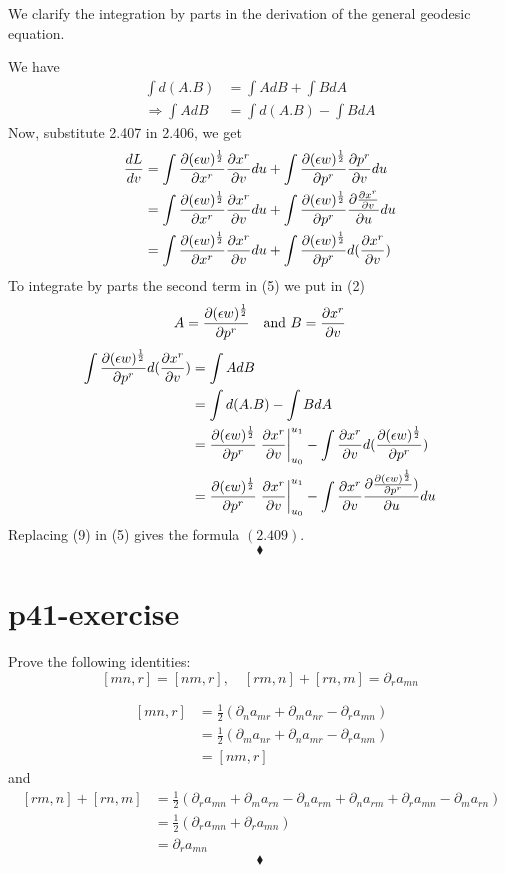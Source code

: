 \begin{tcolorbox}
We clarify the integration by parts in the derivation of the general  geodesic equation.
\end{tcolorbox}
We have 
\begin{align}
\int d(A.B) &= \int AdB + \int BdA\\
\Rightarrow  \int AdB &=  \int d(A.B)-\int BdA
\end{align}
Now, substitute 2.407 in 2.406, we get
\begin{align}
\dv{L}{v} &= \int \pdv{(\epsilon w)^{\frac{1}{2}}}{x^r} \pdv{x^r}{v} du +  \int \pdv{(\epsilon w)^{\frac{1}{2}}}{p^r} \pdv{p^r}{v} du\\
\ &= \int \pdv{(\epsilon w)^{\frac{1}{2}}}{x^r} \pdv{x^r}{v} du +  \int \pdv{(\epsilon w)^{\frac{1}{2}}}{p^r} \pdv{\pdv{x^r}{v}}{u} du\\
&= \int \pdv{(\epsilon w)^{\frac{1}{2}}}{x^r} \pdv{x^r}{v} du +  \int \pdv{(\epsilon w)^{\frac{1}{2}}}{p^r} d(\pdv{x^r}{v})
\end{align}
To integrate by parts the second term in (5) we put in (2)
$$A= \pdv{(\epsilon w)^{\frac{1}{2}}}{p^r} \quad \text{and } B = \pdv{x^r}{v}$$
\begin{align}
\int \pdv{(\epsilon w)^{\frac{1}{2}}}{p^r} d(\pdv{x^r}{v}) &= \int AdB \\
\ & = \int d(A.B)-\int BdA\\
\ &= \pdv{(\epsilon w)^{\frac{1}{2}}}{p^r}\left.\pdv{x^r}{v}\right|_{u_0}^{u_1} - \int \pdv{x^r}{v}d(\pdv{(\epsilon w)^{\frac{1}{2}}}{p^r} )\\
\ &= \pdv{(\epsilon w)^{\frac{1}{2}}}{p^r}\left.\pdv{x^r}{v}\right|_{u_0}^{u_1} - \int \pdv{x^r}{v}\pdv{\pdv{(\epsilon w)^{\frac{1}{2}}}{p^r} )}{u}du
\end{align}
Replacing (9) in (5) gives the formula $\mathbf{(2.409)}$.
$$\blacklozenge$$
\newpage

\section{p41-exercise}
\begin{tcolorbox}
Prove the following identities: $$ [mn,r] = [nm,r], \quad [rm,n]+[rn,m] = \partial_r a_{mn}$$
\end{tcolorbox}
\begin{align*}
\ [mn,r] &= \frac{1}{2}(\partial_{n} a_{mr}+ \partial_{m} a_{nr} - \partial_{r} a_{mn})\\
\ &= \frac{1}{2}(\partial_{m} a_{nr} + \partial_{n} a_{mr}  - \partial_{r} a_{nm})\\
\ &=[nm,r] 
\end{align*}
and 
\begin{align*}
\ [rm,n] + [rn,m]&= \frac{1}{2}(\partial_{r} a_{mn}+ \partial_{m} a_{rn} - \partial_{n} a_{rm} + \partial_{n} a_{rm}+ \partial_{r} a_{mn} - \partial_{m} a_{rn})\\
\ &= \frac{1}{2}(\partial_{r} a_{mn}+\partial_{r} a_{mn})\\
\ &=\partial_{r} a_{mn}
\end{align*}
$$\blacklozenge$$
\newpage

